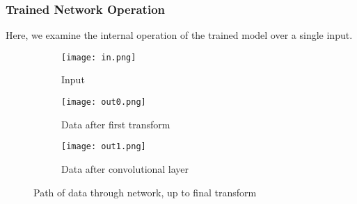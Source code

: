 \subsubsection{Trained Network Operation}
Here, we examine the internal operation of the trained model over a single 
input.
\begin{figure}[h]
	\centering
	\begin{subfigure}{.15\textwidth}
		\centering
		\texttt{[image: in.png]}
		\caption{Input}
	\end{subfigure}
	\hspace{1em}
	\begin{subfigure}{.3\textwidth}
		\texttt{[image: out0.png]}
		\caption{Data after first transform}
	\end{subfigure}
	\hspace{1em}
	\begin{subfigure}{.3\textwidth}
		\texttt{[image: out1.png]}
		\caption{Data after convolutional layer}
	\end{subfigure}
	\caption{Path of data through network, up to final transform}
	\label{fig:3neur_input}
\end{figure}
